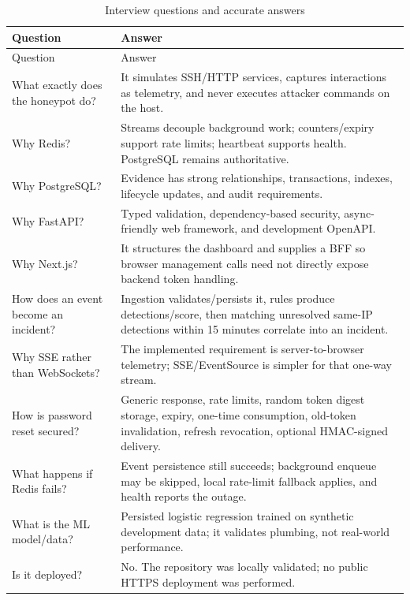 \documentclass[11pt,oneside]{book}
\begin{document}
\begin{longtable}{p{54mm}p{92mm}}\caption{Interview questions and accurate answers}\\\toprule Question & Answer\\\midrule\endfirsthead\toprule Question & Answer\\\midrule\endhead
What exactly does the honeypot do? & It simulates SSH/HTTP services, captures interactions as telemetry, and never executes attacker commands on the host.\\
Why Redis? & Streams decouple background work; counters/expiry support rate limits; heartbeat supports health. PostgreSQL remains authoritative.\\
Why PostgreSQL? & Evidence has strong relationships, transactions, indexes, lifecycle updates, and audit requirements.\\
Why FastAPI? & Typed validation, dependency-based security, async-friendly web framework, and development OpenAPI.\\
Why Next.js? & It structures the dashboard and supplies a BFF so browser management calls need not directly expose backend token handling.\\
How does an event become an incident? & Ingestion validates/persists it, rules produce detections/score, then matching unresolved same-IP detections within 15 minutes correlate into an incident.\\
Why SSE rather than WebSockets? & The implemented requirement is server-to-browser telemetry; SSE/EventSource is simpler for that one-way stream.\\
How is password reset secured? & Generic response, rate limits, random token digest storage, expiry, one-time consumption, old-token invalidation, refresh revocation, optional HMAC-signed delivery.\\
What happens if Redis fails? & Event persistence still succeeds; background enqueue may be skipped, local rate-limit fallback applies, and health reports the outage.\\
What is the ML model/data? & Persisted logistic regression trained on synthetic development data; it validates plumbing, not real-world performance.\\
Is it deployed? & No. The repository was locally validated; no public HTTPS deployment was performed.\\\bottomrule\end{longtable}
\end{document}

